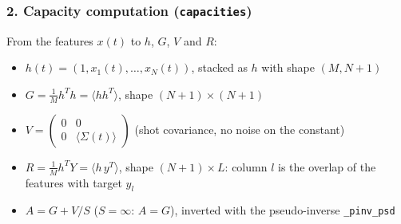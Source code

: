 \subsubsection*{2. Capacity computation (\texttt{capacities})}
From the features $x(t)$ to $h$, $G$, $V$ and $R$:
\begin{itemize}
    \item $h(t) = (1, x_1(t), \ldots, x_N(t))$, stacked as $h$ with shape $(M, N+1)$
    \item $G = \frac{1}{M} h^T h = \langle h h^T \rangle$, shape $(N+1) \times (N+1)$
    \item $V = \begin{pmatrix} 0 & 0 \\ 0 & \langle \Sigma(t) \rangle \end{pmatrix}$ (shot covariance, no
    noise on the constant)
    \item $R = \frac{1}{M} h^T Y = \langle h\, y^T \rangle$, shape $(N+1) \times L$: column $l$ is the overlap
    of the features with target $y_l$
    \item $A = G + V/S$ ($S = \infty$: $A = G$), inverted with the pseudo-inverse \texttt{\_pinv\_psd}
\end{itemize}

